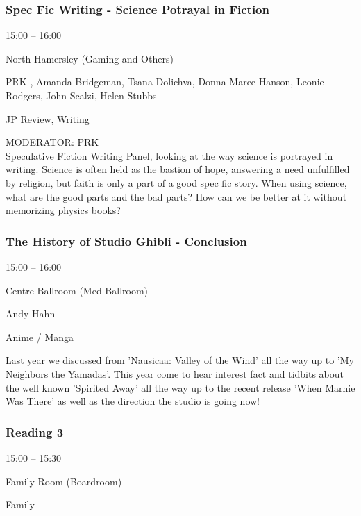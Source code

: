 \documentclass{scrreprt}
\begin{document}
\begin{multicols}{2}
\subsubsection*{Spec Fic Writing - Science Potrayal in Fiction}\begin{description}
\setlength{\itemsep}{0pt}
\setlength{\parsep}{0pt}
\setlength{\parskip}{0pt}
\item[Time:]{15:00 -- 16:00}
\item[Venue:]{North Hamersley (Gaming and Others)}
\item[People:]{PRK , Amanda Bridgeman, Tsana Dolichva, Donna Maree Hanson, Leonie Rodgers, John Scalzi, Helen Stubbs}
\item[Tags:]{JP Review, Writing}\end{description}
MODERATOR: PRK\\Speculative Fiction Writing Panel, looking at the way science is portrayed in writing. Science is often held as the bastion of hope, answering a need unfulfilled by religion, but faith is only a part of a good spec fic story. When using science, what are the good parts and the bad parts? How can we be better at it without memorizing physics books?
\subsubsection*{The History of Studio Ghibli - Conclusion}\begin{description}
\setlength{\itemsep}{0pt}
\setlength{\parsep}{0pt}
\setlength{\parskip}{0pt}
\item[Time:]{15:00 -- 16:00}
\item[Venue:]{Centre Ballroom (Med Ballroom)}
\item[People:]{Andy Hahn}
\item[Tags:]{Anime / Manga}\end{description}
Last year we discussed from 'Nausicaa: Valley of the Wind' all the way up to 'My Neighbors the Yamadas'. This year come to hear interest fact and tidbits about the well known 'Spirited Away' all the way up to the recent release 'When Marnie Was There' as well as the direction the studio is going now!
\subsubsection*{Reading 3}\begin{description}
\setlength{\itemsep}{0pt}
\setlength{\parsep}{0pt}
\setlength{\parskip}{0pt}
\item[Time:]{15:00 -- 15:30}
\item[Venue:]{Family Room (Boardroom)}
\item[Tags:]{Family}\end{description}


\end{multicols}
\end{document}
